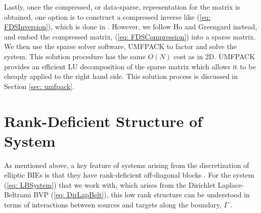 \documentclass{sfuthesis}
\begin{document}
Lastly, once the compressed, or data-sparse, representation for the matrix is obtained, one option is to construct a compressed inverse like (\ref{eq: FDSInversion}), which is done in \cite{GillYoungMart2012, MartRokh2005}. However, we follow Ho and Greengard \cite{HoGreen2012} instead, and embed the compressed matrix, (\ref{eq: FDSCompression}) into a sparse matrix. We then use the sparse solver software, UMFPACK to factor and solve the system. This solution procedure has the same $O(N)$ cost as in 2D. UMFPACK provides an efficient LU decomposition of the sparse matrix which allows it to be cheaply applied to the right hand side. This solution process is discussed in Section \ref{sec: umfpack}. 

\section{Rank-Deficient Structure of System}
\label{sec: RankDeficientSystem}
As mentioned above, a key feature of systems arising from the discretization of elliptic BIEs is that they have rank-deficient off-diagonal blocks \cite{ChengEtAl2005, MartRokh2005, Stein2007}. For the system (\ref{eq: LBSystem}) that we work with, which arises from the Dirichlet Laplace-Beltrami BVP (\ref{eq: DirLapBelt}), this low rank structure can be understood in terms of interactions between sources and targets along the boundary, $\Gamma$ \cite{ChengEtAl2005, MartRokh2005, HoGreen2012}. 
\end{document}
